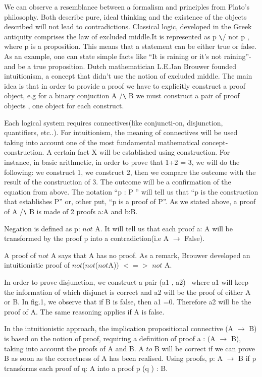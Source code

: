 \documentclass[a4paper,12pt]{book}
\begin{document}
 We can observe a resemblance between a formalism and principles from Plato's philosophy. Both describe pure, ideal thinking and the existence of the objects described will not lead to contradictions. Classical logic, developed in the Greek antiquity comprises the law of excluded middle.It is represented as p \verb+\+/ not p , where p is a proposition. This means that a statement can be either true or false. As an example, one can state simple facts like “It is raining or it’s not raining”- and be a true proposition.
Dutch mathematician L.E.Jan Brouwer founded intuitionism, a concept that didn’t use the notion of excluded middle. The main idea is that in order to provide a proof we have to explicitly construct a proof object, e.g for a binary conjuction A /\verb+\+ B we must construct a pair of proof objects , one object for each construct.

Each logical system requires connectives(like conjuncti-on, disjunction, quantifiers, etc..). For intuitionism, the meaning of connectives will be used taking into account one of the most fundamental mathematical concept- construction. A certain fact X will be established using construction. For instance, in basic arithmetic, in order to prove that 1+2 = 3, we will do the following: we construct 1, we construct 2, then we compare the outcome with the result of the construction of 3. The outcome will be a confirmation of the equation from above. The notation “p : P ” will tell us that “p is the construction that establishes P” or, other put, “p is a proof of P”. As we stated above, a proof of A /\verb+\+ B is made of 2 proofs a:A and b:B.

Negation is defined as p: $not$ A. It will tell us that each proof a: A will be transformed by the proof p into a contradiction(i.e A $\to $ False).

A proof of $not$ A says that A has no proof. As a remark, Brouwer developed an intuitionistic proof of $not$($not$($not$A)) $<=>$ $not$ A.

In order to prove disjunction, we construct a pair (a1 , a2) –where a1 will keep the information of which disjunct is correct and a2 will be the proof of either A or B. In fig.1, we observe that if B is false, then a1 =0. Therefore a2 will be the proof of A. The same reasoning applies if A is false.

In the intuitionistic approach, the implication propositional connective (A $\to$ B) is based on the notion of proof, requiring a definition of proof a : (A $\to$ B), taking into account the proofs of A and B. A $to$ B will be correct if we can prove B as soon as the correctness of A has been realised. Using proofs, p: A $\to $ B if p transforms each proof of q: A into a proof p (q ) : B.
\end{document}
